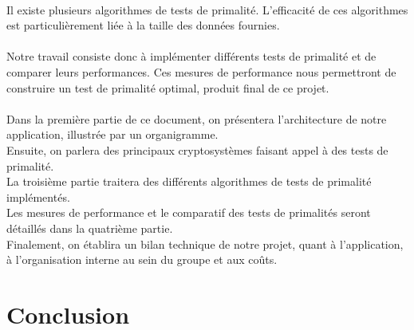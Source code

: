 	\paragraph{}Il existe plusieurs algorithmes de tests de primalité. L'efficacité de ces algorithmes est particulièrement liée à la taille des données fournies. 
	\paragraph{}Notre travail consiste donc à implémenter différents tests de primalité et de comparer leurs performances. Ces mesures de performance nous permettront de construire un test de primalité optimal, produit final de ce projet. 
	\paragraph{}Dans la première partie de ce document, on présentera l'architecture de notre application, illustrée par un organigramme.\\
	Ensuite, on parlera des principaux cryptosystèmes faisant appel à des tests de primalité. \\
	La troisième partie traitera des différents algorithmes de tests de primalité implémentés.\\
	Les mesures de performance et le comparatif des tests de primalités seront détaillés dans la quatrième partie.\\
	Finalement, on établira un bilan technique de notre projet, quant à l'application, à l'organisation interne au sein du groupe et aux coûts.
	
	
	
	
	
	
	
	
	
	
	
	
	
	\section*{Conclusion}
	
		

